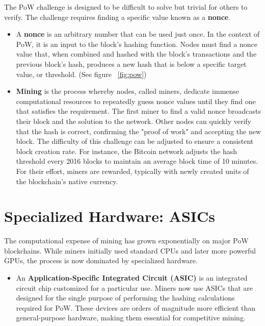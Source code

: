 \documentclass{scrbook}
\begin{document}
The PoW challenge is designed to be difficult to solve but trivial for others to verify. The challenge requires finding a specific value known as a \textbf{nonce}.

\begin{itemize}
    \item A \textbf{nonce} is an arbitrary number that can be used just once. In the context of PoW, it is an input to the block's hashing function. Nodes must find a nonce value that, when combined and hashed with the block's transactions and the previous block's hash, produces a new hash that is below a specific target value, or threshold. (See figure ~\ref{fig:pow})
    
    \item \textbf{Mining} is the process whereby nodes, called miners, dedicate immense computational resources to repeatedly guess nonce values until they find one that satisfies the requirement. The first miner to find a valid nonce broadcasts their block and the solution to the network. Other nodes can quickly verify that the hash is correct, confirming the "proof of work" and accepting the new block. The difficulty of this challenge can be adjusted to ensure a consistent block creation rate. For instance, the Bitcoin network adjusts the hash threshold every 2016 blocks to maintain an average block time of 10 minutes. For their effort, miners are rewarded, typically with newly created units of the blockchain's native currency.
\end{itemize}

\section{Specialized Hardware: ASICs}

The computational expense of mining has grown exponentially on major PoW blockchains. While miners initially used standard CPUs and later more powerful GPUs, the process is now dominated by specialized hardware.

\begin{itemize}
    \item An \textbf{Application-Specific Integrated Circuit (ASIC)} is an integrated circuit chip customized for a particular use. Miners now use ASICs that are designed for the single purpose of performing the hashing calculations required for PoW. These devices are orders of magnitude more efficient than general-purpose hardware, making them essential for competitive mining.
\end{itemize}
\end{document}
